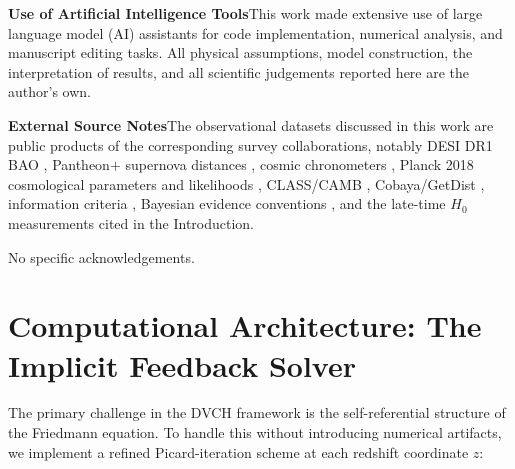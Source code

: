 \documentclass[pdflatex,sn-mathphys-num]{sn-jnl}%
\newif\ifsnclass
\begin{document}
\textbf{Use of Artificial Intelligence Tools}\quad This work made extensive
use of large language model (AI) assistants for code implementation,
numerical analysis, and manuscript editing tasks. All physical assumptions,
model construction, the interpretation of results, and all scientific
judgements reported here are the author's own.

\textbf{External Source Notes}\quad The observational datasets discussed in this
work are public products of the corresponding survey collaborations, notably
DESI DR1 BAO \cite{Adame:2024ywp}, Pantheon$+$ supernova distances
\cite{Brout2022}, cosmic chronometers \cite{Moresco:2016mzx}, Planck 2018 cosmological parameters and likelihoods \cite{Aghanim:2018eyx,Planck:2019nip}, CLASS/CAMB \cite{Blas:2011rf,Lewis:1999bs}, Cobaya/GetDist \cite{Torrado:2020dgo,Lewis:2019xzd}, information criteria \cite{Akaike:1974,Schwarz:1978}, Bayesian evidence conventions \cite{Jeffreys:1961}, and the late-time
$H_0$ measurements cited in the Introduction.

\ifsnclass
\section*{Acknowledgements}
No specific acknowledgements.
\else
\begin{acknowledgments}
No specific acknowledgements.
\end{acknowledgments}
\fi

\appendix

\section{Computational Architecture: The Implicit Feedback Solver}
\label{app:numerical}

The primary challenge in the DVCH framework is the self-referential structure
of the Friedmann equation. To handle this without introducing numerical
artifacts, we implement a refined Picard-iteration scheme at each redshift
coordinate $z$:
\end{document}
